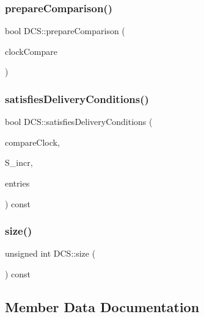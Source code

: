 \mbox{\label{class_d_c_s_a8d66ffc382de5519aa7fb3844b6790af}} 
\subsubsection{\texorpdfstring{prepare\+Comparison()}{prepareComparison()}}
{\footnotesize\ttfamily bool D\+C\+S\+::prepare\+Comparison (\begin{DoxyParamCaption}\item[{\hyperlink{class_d_c_s}{D\+CS}}]{clock\+Compare }\end{DoxyParamCaption})}

\mbox{\label{class_d_c_s_aeb765d2361e829ba54620d99e2fb4bf1}} 
\subsubsection{\texorpdfstring{satisfies\+Delivery\+Conditions()}{satisfiesDeliveryConditions()}}
{\footnotesize\ttfamily bool D\+C\+S\+::satisfies\+Delivery\+Conditions (\begin{DoxyParamCaption}\item[{const \hyperlink{class_d_c_s}{D\+CS} \&}]{compare\+Clock,  }\item[{const vector$<$ unsigned int $>$ \&}]{S\+\_\+incr,  }\item[{const vector$<$ unsigned int $>$ \&}]{entries }\end{DoxyParamCaption}) const}

\mbox{\label{class_d_c_s_ac428129bbebba59be9a09c09c1096323}} 
\subsubsection{\texorpdfstring{size()}{size()}}
{\footnotesize\ttfamily unsigned int D\+C\+S\+::size (\begin{DoxyParamCaption}{ }\end{DoxyParamCaption}) const}



\subsection{Member Data Documentation}
\mbox{\label{class_d_c_s_a0922c1733e23bf6098b71890da57e762}} 
